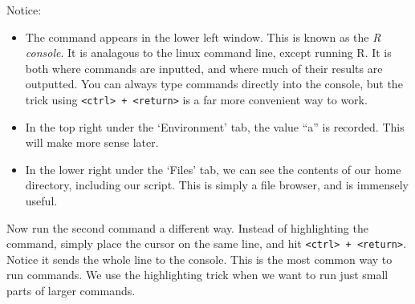 \documentclass[
]{article}
\providecommand{\tightlist}{%
  \setlength{\itemsep}{0pt}\setlength{\parskip}{0pt}}
\begin{document}
Notice:

\begin{itemize}
\tightlist
\item
  The command appears in the lower left window. This is known as the
  \emph{R console}. It is analagous to the linux command line, except
  running R. It is both where commands are inputted, and where much of
  their results are outputted. You can always type commands directly
  into the console, but the trick using
  \texttt{\textless{}ctrl\textgreater{}\ +\ \textless{}return\textgreater{}}
  is a far more convenient way to work.
\item
  In the top right under the `Environment' tab, the value ``a'' is
  recorded. This will make more sense later.
\item
  In the lower right under the `Files' tab, we can see the contents of
  our home directory, including our script. This is simply a file
  browser, and is immensely useful.
\end{itemize}

Now run the second command a different way. Instead of highlighting the
command, simply place the cursor on the same line, and hit
\texttt{\textless{}ctrl\textgreater{}\ +\ \textless{}return\textgreater{}}.
Notice it sends the whole line to the console. This is the most common
way to run commands. We use the highlighting trick when we want to run
just small parts of larger commands.
\end{document}
